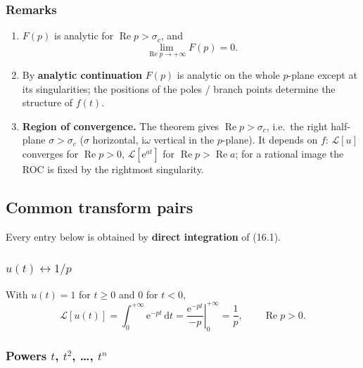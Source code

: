 \documentclass[11pt,a4paper]{article}
\theoremstyle{definition}
\theoremstyle{plain}
\begin{document}
\subsubsection{Remarks}

\begin{enumerate}
    \item $F(p)$ is analytic for $\operatorname{Re}p>\sigma_c$, and
\begin{equation}
\lim_{\operatorname{Re}p\to+\infty}F(p)=0 . \tag{16.8}
\end{equation}
    \item By \textbf{analytic continuation} $F(p)$ is analytic on the whole $p$-plane except at
          its singularities; the positions of the poles / branch points determine the structure
          of $f(t)$.
    \item \textbf{Region of convergence.} The theorem gives $\operatorname{Re}p>\sigma_c$, i.e.\ the right half-plane $\sigma>\sigma_c$
          ($\sigma$ horizontal, $\mathrm{i}\omega$ vertical in the $p$-plane). It depends on
          $f$: $\mathcal{L}[u]$ converges for $\operatorname{Re}p>0$, $\mathcal{L}[\mathrm{e}^{at}]$ for
          $\operatorname{Re}p>\operatorname{Re}a$; for a rational image the ROC is fixed by the
          rightmost singularity.
\end{enumerate}

\clearpage
\subsection{Common transform pairs}

Every entry below is obtained by \textbf{direct integration} of (16.1).

\subsubsection{$u(t)\leftrightarrow 1/p$}

With $u(t)=1$ for $t\ge 0$ and $0$ for $t<0$,
\begin{equation}
\mathcal{L}\left[u(t)\right]=\int_{0}^{+\infty}\mathrm{e}^{-pt}\,\mathrm{d}t
=\left.\frac{\mathrm{e}^{-pt}}{-p}\right|_{0}^{+\infty}=\frac{1}{p},
\qquad \operatorname{Re}p>0 . \tag{16.9}
\end{equation}

\subsubsection{Powers $t$, $t^{2}$, \dots, $t^{n}$}
\end{document}
